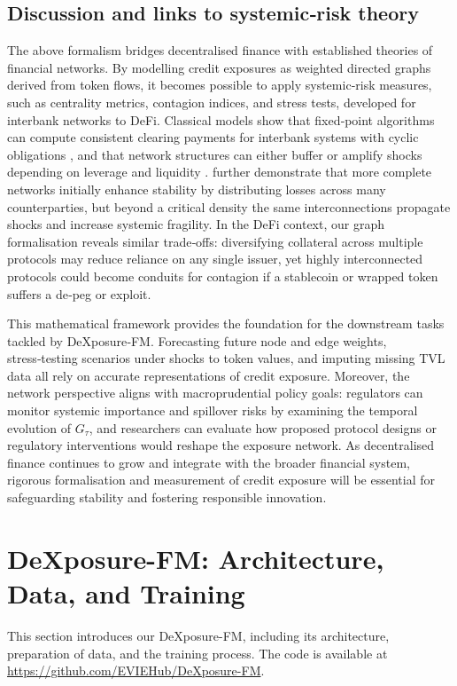\documentclass[preprint,12pt]{elsarticle}
\begin{document}
\subsection{Discussion and links to systemic‑risk theory}

The above formalism bridges decentralised finance with established theories of financial networks.  By modelling credit exposures as weighted directed graphs derived from token flows, it becomes possible to apply systemic‑risk measures, such as centrality metrics, contagion indices, and stress tests, developed for interbank networks to DeFi.  Classical models show that fixed‑point algorithms can compute consistent clearing payments for interbank systems with cyclic obligations \cite{EisenbergNoe2001}, and that network structures can either buffer or amplify shocks depending on leverage and liquidity \cite{Glasserman2016}.  \cite{Acemoglu2013} further demonstrate that more complete networks initially enhance stability by distributing losses across many counterparties, but beyond a critical density the same interconnections propagate shocks and increase systemic fragility.  In the DeFi context, our graph formalisation reveals similar trade‑offs: diversifying collateral across multiple protocols may reduce reliance on any single issuer, yet highly interconnected protocols could become conduits for contagion if a stablecoin or wrapped token suffers a de‑peg or exploit.

This mathematical framework provides the foundation for the downstream tasks tackled by DeXposure‑FM.  Forecasting future node and edge weights, stress‑testing scenarios under shocks to token values, and imputing missing TVL data all rely on accurate representations of credit exposure.  Moreover, the network perspective aligns with macroprudential policy goals: regulators can monitor systemic importance and spillover risks by examining the temporal evolution of $G_\tau$, and researchers can evaluate how proposed protocol designs or regulatory interventions would reshape the exposure network.  As decentralised finance continues to grow and integrate with the broader financial system, rigorous formalisation and measurement of credit exposure will be essential for safeguarding stability and fostering responsible innovation. \section{DeXposure-FM: Architecture, Data, and Training}

This section introduces our DeXposure-FM, including its architecture, preparation of data, and the training process. The code is available at \url{https://github.com/EVIEHub/DeXposure-FM}.
\end{document}
